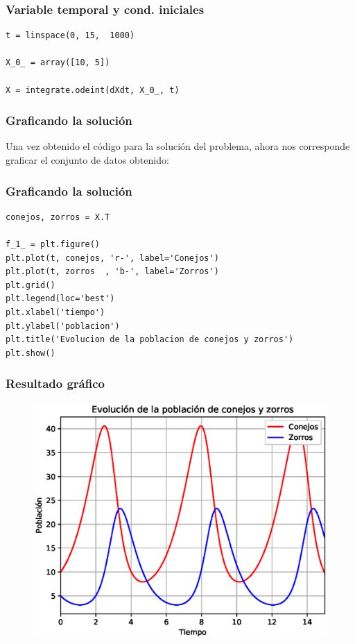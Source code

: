 \begin{frame}[fragile]
\frametitle{Variable temporal y cond. iniciales}
\begin{lstlisting}[caption=Código para las condiciones iniciales, style=FormattedNumber, basicstyle=\linespread{1.1}\ttfamily=\small, columns=fullflexible]
t = linspace(0, 15,  1000)
              
X_0_ = array([10, 5])         
            
X = integrate.odeint(dXdt, X_0_, t)
\end{lstlisting}
\end{frame}
\begin{frame}
\frametitle{Graficando la solución}
Una vez obtenido el código para la solución del problema, ahora nos corresponde graficar el conjunto de datos obtenido:
\end{frame}
\begin{frame}
\frametitle{Graficando la solución}
\begin{lstlisting}[caption=Código para graficar, style=FormattedNumber, basicstyle=\linespread{1.1}\ttfamily=\small, columns=fullflexible]
conejos, zorros = X.T

f_1_ = plt.figure()
plt.plot(t, conejos, 'r-', label='Conejos')
plt.plot(t, zorros  , 'b-', label='Zorros')
plt.grid()
plt.legend(loc='best')
plt.xlabel('tiempo')
plt.ylabel('poblacion')
plt.title('Evolucion de la poblacion de conejos y zorros')
plt.show()
\end{lstlisting}
\end{frame}
\begin{frame}[plain]
\frametitle{Resultado gráfico}
\begin{figure}
    \centering
    \includegraphics[scale=0.6]{Imagenes/LotkaVolterra_01.eps} 
\end{figure}
\end{frame}
